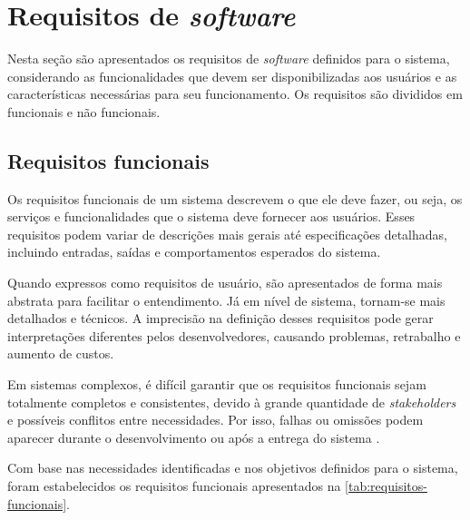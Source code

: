 \chapter{Requisitos de \textit{software}}

Nesta seção são apresentados os requisitos de \textit{software} definidos para o sistema, considerando as funcionalidades que devem ser disponibilizadas aos usuários e as características necessárias para seu funcionamento. Os requisitos são divididos em funcionais e não funcionais.

\section{Requisitos funcionais}

Os requisitos funcionais de um sistema descrevem o que ele deve fazer, ou seja, os serviços e funcionalidades que o sistema deve fornecer aos usuários. Esses requisitos podem variar de descrições mais gerais até especificações detalhadas, incluindo entradas, saídas e comportamentos esperados do sistema.

Quando expressos como requisitos de usuário, são apresentados de forma mais abstrata para facilitar o entendimento. Já em nível de sistema, tornam-se mais detalhados e técnicos. A imprecisão na definição desses requisitos pode gerar interpretações diferentes pelos desenvolvedores, causando problemas, retrabalho e aumento de custos.

Em sistemas complexos, é difícil garantir que os requisitos funcionais sejam totalmente completos e consistentes, devido à grande quantidade de \textit{stakeholders} e possíveis conflitos entre necessidades. Por isso, falhas ou omissões podem aparecer durante o desenvolvimento ou após a entrega do sistema \cite{Sommerville2011}.

Com base nas necessidades identificadas e nos objetivos definidos para o sistema, foram estabelecidos os requisitos funcionais apresentados na \autoref{tab:requisitos-funcionais}.

